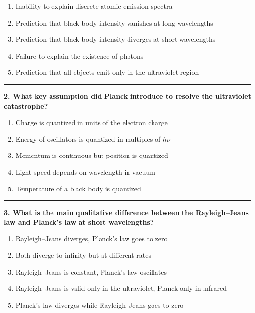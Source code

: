 \documentclass[
  english,
  9pt,
]{extbook}
\providecommand{\tightlist}{%
  \setlength{\itemsep}{0pt}\setlength{\parskip}{0pt}}
\theoremstyle{definition}
\theoremstyle{definition}
\theoremstyle{definition}
\theoremstyle{definition}
\theoremstyle{remark}
\begin{document}
\begin{enumerate}
\def\labelenumi{\alph{enumi}.}
\tightlist
\item
  Inability to explain discrete atomic emission spectra\\
\item
  Prediction that black-body intensity vanishes at long wavelengths\\
\item
  Prediction that black-body intensity diverges at short wavelengths\\
\item
  Failure to explain the existence of photons\\
\item
  Prediction that all objects emit only in the ultraviolet region
\end{enumerate}

\begin{center}\rule{0.5\linewidth}{0.5pt}\end{center}

\textbf{2. What key assumption did Planck introduce to resolve the ultraviolet catastrophe?}

\begin{enumerate}
\def\labelenumi{\alph{enumi}.}
\tightlist
\item
  Charge is quantized in units of the electron charge\\
\item
  Energy of oscillators is quantized in multiples of \(h\nu\)
\item
  Momentum is continuous but position is quantized\\
\item
  Light speed depends on wavelength in vacuum\\
\item
  Temperature of a black body is quantized
\end{enumerate}

\begin{center}\rule{0.5\linewidth}{0.5pt}\end{center}

\textbf{3. What is the main qualitative difference between the Rayleigh--Jeans law and Planck's law at short wavelengths?}

\begin{enumerate}
\def\labelenumi{\alph{enumi}.}
\tightlist
\item
  Rayleigh--Jeans diverges, Planck's law goes to zero\\
\item
  Both diverge to infinity but at different rates\\
\item
  Rayleigh--Jeans is constant, Planck's law oscillates\\
\item
  Rayleigh--Jeans is valid only in the ultraviolet, Planck only in infrared\\
\item
  Planck's law diverges while Rayleigh--Jeans goes to zero
\end{enumerate}
\end{document}
